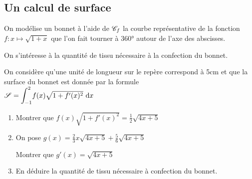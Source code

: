\documentclass[oneside,12pt]{book}          %
\begin{document}
\subsection{Un calcul de surface}
\begin{minipage}{0.49\textwidth}
On modélise un bonnet à l'aide de ${\mathscr{C}}_f$ la courbe représentative de la fonction $f:x\mapsto\sqrt{1+x}$ que l'on fait tourner à 360° autour de l'axe des abscisses.

On s'intéresse à la quantité de tissu nécessaire à la confection du bonnet.

On considère qu'une unité de longueur sur le repère correspond à 5cm et que la surface du bonnet est donnée par la formule\\[5pt]
${\mathscr{S}}={\displaystyle\int_{-1}^{2}}f(x)\sqrt{1+f'(x)^2}{\,\,\mathrm{d}} x$

\begin{enumerate}
    \item Montrer que $f(x)\sqrt{1+f'(x)^2} = \frac{1}{2}\sqrt{4x+5}$
    \item On pose $g(x)=\frac{2}{3}x\sqrt{4x+5}+\frac{5}{6}\sqrt{4x+5}$
    
    Montrer que $g'(x)=\sqrt{4x+5}$
    \item En déduire la quantité de tissu nécessaire à confection du bonnet.
\end{enumerate}


\end{minipage}
\hspace{30pt}
\end{document}
